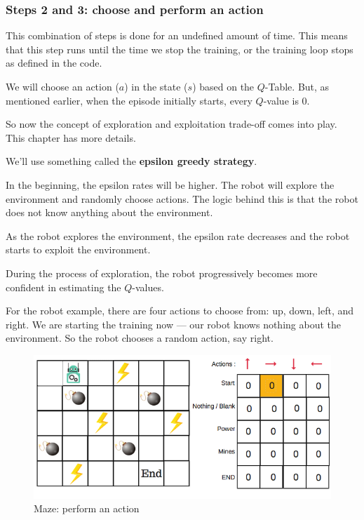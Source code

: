 \subsubsection{Steps 2 and 3: choose and perform an action}

This combination of steps is done for an undefined amount of time. This means that 
this step runs until the time we stop the training, or the training loop stops as 
defined in the code.

We will choose an action ($a$) in the state ($s$) based on the $Q$-Table. But, as 
mentioned earlier, when the episode initially starts, every $Q$-value is $0$.

So now the concept of exploration and exploitation trade-off comes into play. This 
chapter has more details.

We'll use something called the {\bf epsilon greedy strategy}.

In the beginning, the epsilon rates will be higher. The robot will explore the 
environment and randomly choose actions. The logic behind this is that the robot 
does not know anything about the environment.

As the robot explores the environment, the epsilon rate decreases and the robot 
starts to exploit the environment.

During the process of exploration, the robot progressively becomes more confident in 
estimating the $Q$-values.

For the robot example, there are four actions to choose from: up, down, left, and 
right. We are starting the training now — our robot knows nothing about the 
environment. So the robot chooses a random action, say right.

\begin{figure}[!htb]
\centering
\includegraphics[scale=0.5]{pix/q_learning/q_robot_maze_perform_action.png}
\caption{Maze: perform an action}
\end{figure}

